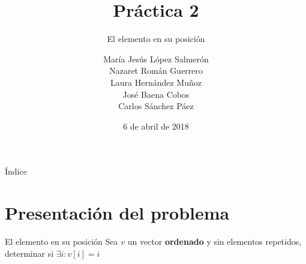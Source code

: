 \documentclass{beamer}
\title{Práctica 2}
\date{6 de abril de 2018}
\subtitle{El elemento en su posición}
\author{María Jesús López Salmerón \\ Nazaret Román Guerrero \\ Laura Hernández Muñoz \\ José Baena Cobos  \\ Carlos Sánchez Páez}
\begin{document}
\centering
\begin{frame}
  \titlepage
\end{frame}

\begin{frame}{Índice}
  \tableofcontents
\end{frame}

\section{Presentación del problema}

\begin{frame}[fragile]{El elemento en su posición}
Sea $v$ un vector \textbf{ordenado} y sin elementos repetidos, determinar si $\exists i : v[i]=i $
\end{frame}
\end{document}
